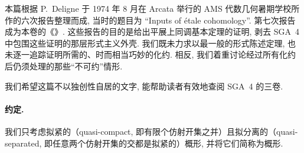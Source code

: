 本篇根据 P.~Deligne 于 1974 年 8 月在 Arcata 举行的 AMS 代数几何暑期学校所作的六次报告整理而成, 当时的题目为 “Inputs of étale cohomology”. 第七次报告成为本卷的《》. 这些报告的目的是给出平展上同调基本定理的证明, 剥去 SGA~4 中包围这些证明的那层形式主义外壳. 我们既未力求以最一般的形式陈述定理, 也未逐一追踪证明所需的、时而相当巧妙的化约. 相反, 我们着重讨论经过所有化约后仍须处理的那些“不可约”情形.

我们希望这篇不以独创性自居的文字, 能帮助读者有效地查阅 SGA~4 的三卷.

\paragraph*{约定.}
我们只考虑拟紧的（quasi-compact, 即有限个仿射开集之并）且拟分离的（quasi-separated, 即任意两个仿射开集的交都是拟紧的）概形, 并将它们简称为概形.

\medskip
